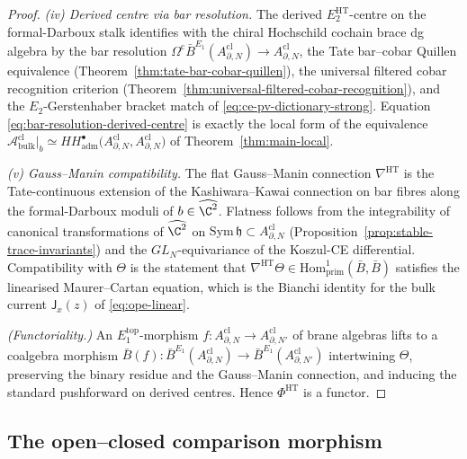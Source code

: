 \begin{proof}
\emph{(iv) Derived centre via bar resolution.}
The derived \(E_2^{\mathrm{HT}}\)-centre on the formal-Darboux stalk
identifies with the chiral Hochschild cochain brace dg algebra by the
bar resolution
\(\Omega^{\mathrm{c}}\bar B^{E_1}(A^{\mathrm{cl}}_{\partial,N})
\to A^{\mathrm{cl}}_{\partial,N}\), the Tate bar--cobar Quillen
equivalence (Theorem~\ref{thm:tate-bar-cobar-quillen}), the universal
filtered cobar recognition criterion
(Theorem~\ref{thm:universal-filtered-cobar-recognition}), and the
\(E_2\)-Gerstenhaber bracket match of
\eqref{eq:ce-pv-dictionary-strong}.  Equation
\eqref{eq:bar-resolution-derived-centre} is exactly the local form of
the equivalence
\(\mathcal A^{\mathrm{cl}}_{\mathrm{bulk}}|_b\simeq
HH^\bullet_{\mathrm{adm}}\!\bigl(A^{\mathrm{cl}}_{\partial,N},
A^{\mathrm{cl}}_{\partial,N}\bigr)\) of
Theorem~\ref{thm:main-local}.

\emph{(v) Gauss--Manin compatibility.}
The flat Gauss--Manin connection \(\nabla^{\mathrm{HT}}\) is the
Tate-continuous extension of the Kashiwara--Kawai connection on bar
fibres along the formal-Darboux moduli of \(b\in\widehat{\C^2}\).
Flatness follows from the integrability of canonical transformations
of \(\widehat{\C^2}\) on
\(\mathrm{Sym}\,\mathfrak h\subset A^{\mathrm{cl}}_{\partial,N}\)
(Proposition~\ref{prop:stable-trace-invariants}) and the
\(GL_N\)-equivariance of the Koszul-CE differential.  Compatibility
with \(\Theta\) is the statement that
\(\nabla^{\mathrm{HT}}\Theta\in\mathrm{Hom}^1_{\mathrm{prim}}(\bar B,
\bar B)\) satisfies the linearised Maurer--Cartan equation, which is
the Bianchi identity for the bulk current
\(\mathsf J_x(z)\) of \eqref{eq:ope-linear}.

\emph{(Functoriality.)}
An \(E_1^{\mathrm{top}}\)-morphism
\(f\colon A^{\mathrm{cl}}_{\partial,N}\to A^{\mathrm{cl}}_{\partial,N'}\)
of brane algebras lifts to a coalgebra morphism
\(\bar B(f)\colon\bar B^{E_1}(A^{\mathrm{cl}}_{\partial,N})\to
\bar B^{E_1}(A^{\mathrm{cl}}_{\partial,N'})\) intertwining \(\Theta\),
preserving the binary residue and the Gauss--Manin connection, and
inducing the standard pushforward on derived centres.  Hence
\(\Phi^{\mathrm{HT}}\) is a functor.
\end{proof}

\subsection{The open--closed comparison morphism}
\label{ssec:oca}

